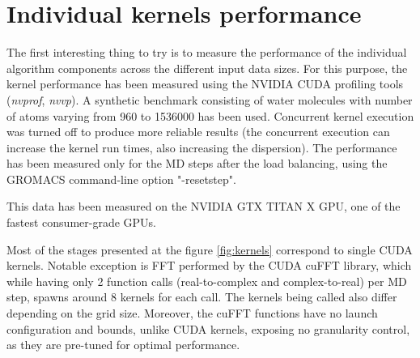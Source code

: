 \documentclass[12pt,a4paper]{report}
\begin{document}
\section{Individual kernels performance} \label{chapter_kernels}

The first interesting thing to try is to measure the performance of the individual algorithm components across the different input data sizes.
For this purpose, the kernel performance has been measured using the NVIDIA CUDA profiling tools (\textit{nvprof}, \textit{nvvp}). A synthetic benchmark consisting of water molecules with number of atoms varying from 960 to 1536000 has been used. 
Concurrent kernel execution was turned off to produce more reliable results (the concurrent execution can increase the kernel run times, also increasing the  dispersion). The performance has been measured only for the MD steps after the load balancing, using the GROMACS command-line option "-resetstep". 
 
This data has been measured on the NVIDIA GTX TITAN X GPU, one of the fastest consumer-grade GPUs.

Most of the stages presented at the figure \ref{fig:kernels} correspond to single CUDA kernels. Notable exception is FFT performed by the CUDA cuFFT library, which while having only 2 function calls (real-to-complex and complex-to-real) per MD step, spawns around 8 kernels for each call. The kernels being called also differ depending on the grid size. Moreover, the cuFFT functions have no launch configuration and bounds, unlike CUDA kernels, exposing no granularity control, as they are pre-tuned for optimal performance. 
\end{document}
